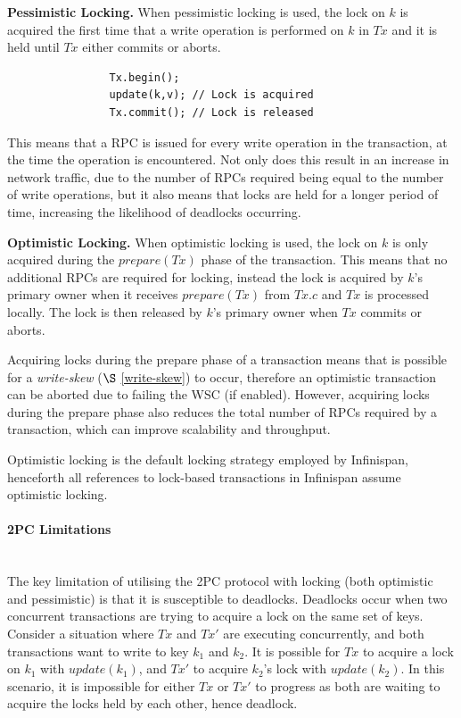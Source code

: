             \textbf{Pessimistic Locking.}
            When pessimistic locking\citep{Bernstein:1981:CCD:356842.356846} is used, the lock on $k$ is acquired the first time that a write operation is performed on $k$ in $Tx$ and it is held until $Tx$ either commits or aborts.  
	       		    
		    \begin{lstlisting}
		    	Tx.begin();
		    	update(k,v); // Lock is acquired
		    	Tx.commit(); // Lock is released
		    \end{lstlisting}

            This means that a RPC is issued for every write operation in the transaction, at the time the operation is encountered.  Not only does this result in an increase in network traffic, due to the number of RPCs required being equal to the number of write operations, but it also means that locks are held for a longer period of time, increasing the likelihood of deadlocks occurring.  
            
	        \textbf{Optimistic Locking.}
	        When optimistic locking\citep{Kung:1981:OMC:319566.319567} is used, the lock on $k$ is only acquired during the $prepare(Tx)$ phase of the transaction.  This means that no additional RPCs are required for locking, instead the lock is acquired by $k$'s primary owner when it receives $prepare(Tx)$ from $Tx.c$ and $Tx$ is processed locally.  The lock is then released by $k$'s primary owner when $Tx$ commits or aborts.  
	        
	        Acquiring locks during the prepare phase of a transaction means that is possible for a  \emph{write-skew} ($\S$ \ref{write-skew}) to occur, therefore an optimistic transaction can be aborted due to failing the WSC (if enabled).  However, acquiring locks during the prepare phase also reduces the total number of RPCs required by a transaction, which can improve scalability and throughput.  
	        
	        Optimistic locking is the default locking strategy employed by Infinispan, henceforth all references to lock-based transactions in Infinispan assume optimistic locking.  
	        
	        \paragraph{2PC Limitations} \hspace{0pt} \\
	        The key limitation of utilising the 2PC protocol with locking (both optimistic and pessimistic) is that it is susceptible to deadlocks.  Deadlocks occur when two concurrent transactions are trying to acquire a lock on the same set of keys.  Consider a situation where $Tx$ and $Tx'$ are executing concurrently, and both transactions want to write to key $k_1$ and $k_2$.  It is possible for $Tx$ to acquire a lock on $k_1$ with $update(k_1)$, and $Tx'$ to acquire $k_2$'s lock with $update(k_2)$.  In this scenario, it is impossible for either $Tx$ or $Tx'$ to progress as both are waiting to acquire the locks held by each other, hence deadlock.  
	        
